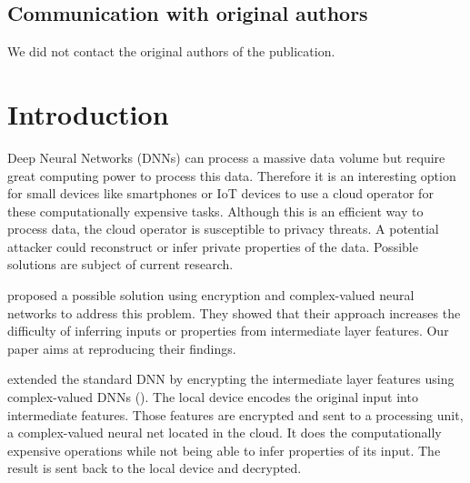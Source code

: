 \subsection*{Communication with original authors}

We did not contact the original authors of the publication.


\newpage
\section{Introduction}

Deep Neural Networks (DNNs) can process a massive data volume but require great computing power to process this data. Therefore it is an interesting option for small devices like smartphones or IoT devices to use a cloud operator for these computationally expensive tasks. Although this is an efficient way to process data, the cloud operator is susceptible to privacy threats. A potential attacker could reconstruct or infer private properties of the data. Possible solutions are subject of current research.

\cite{xiang2020interpretable} proposed a possible solution using encryption and complex-valued neural networks to address this problem. They showed that their approach increases the difficulty of inferring inputs or properties from intermediate layer features. Our paper aims at reproducing their findings.

 \cite{xiang2020interpretable} extended the standard DNN by encrypting the intermediate layer features using complex-valued DNNs (\cite{DBLP:journals/corr/TrabelsiBSSSMRB17}). The local device encodes the original input into intermediate features. Those features are encrypted and sent to a processing unit, a complex-valued neural net located in the cloud. It does the computationally expensive operations while not being able to infer properties of its input. The result is sent back to the local device and decrypted.
 
